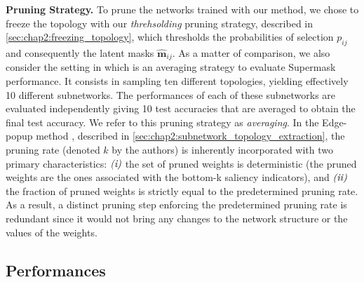 \noindent\textbf{Pruning Strategy.} To prune the networks trained with our
method, we chose to freeze the topology with our \emph{threhsolding} pruning
strategy, described in \cref{sec:chap2:freezing_topology}, which thresholds the
probabilities of selection $p_{ij}$ and consequently the latent masks
$\bm{\hat{m}}_{ij}$. As a matter of comparison, we also consider the setting in
\cite{DBLP:conf/nips/ZhouLLY19} which is an averaging strategy to evaluate
Supermask performance. It consists in sampling ten different topologies,
yielding effectively 10 different subnetworks. The performances of each of these
subnetworks are evaluated independently giving 10 test accuracies that are
averaged to obtain the final test accuracy. We refer to this pruning strategy as
\textit{averaging}. In the Edge-popup method
\cite{DBLP:conf/cvpr/RamanujanWKFR20}, described in
\cref{sec:chap2:subnetwork_topology_extraction}, the pruning rate (denoted $k$
by the authors) is inherently incorporated with two primary characteristics:
$\emph{(i)}$ the set of pruned weights is deterministic (the pruned weights are
the ones associated with the bottom-k saliency indicators), and $\emph{(ii)}$
the fraction of pruned weights is strictly equal to the predetermined pruning
rate. As a result, a distinct pruning step enforcing the predetermined pruning
rate is redundant since it would not bring any changes to the network structure
or the values of the weights.\\

\subsection{Performances}
\label{sec:chap2:performances}

